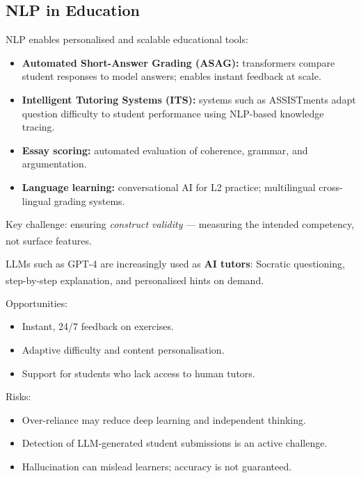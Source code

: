 \subsection{NLP in Education}

\begin{tcbitemize}[ skin=sectionraster ]

    \tcbitem[title=NLP Applications in Education, raster multicolumn=3]
    NLP enables personalised and scalable educational tools:
    \begin{itemize}
        \item \textbf{Automated Short-Answer Grading (ASAG):} transformers compare
              student responses to model answers; enables instant feedback at scale.
        \item \textbf{Intelligent Tutoring Systems (ITS):} systems such as ASSISTments
              adapt question difficulty to student performance using NLP-based knowledge
              tracing.
        \item \textbf{Essay scoring:} automated evaluation of coherence, grammar, and
              argumentation.
        \item \textbf{Language learning:} conversational AI for L2 practice;
              multilingual cross-lingual grading systems.
    \end{itemize}
    Key challenge: ensuring \emph{construct validity} --- measuring the intended
    competency, not surface
    features.\textsuperscript{\cite[][p.~11]{dhamaniIntroductionGenerativeAI2024}}

    \tcbitem[title=LLMs as Educational Assistants, raster multicolumn=3]
    LLMs such as GPT-4 are increasingly used as \textbf{AI tutors}: Socratic
    questioning, step-by-step explanation, and personalised hints on
    demand.\textsuperscript{\cite[][p.~2]{farrisHowLargeLanguage2025}}

    Opportunities:
    \begin{itemize}
        \item Instant, 24/7 feedback on exercises.
        \item Adaptive difficulty and content personalisation.
        \item Support for students who lack access to human tutors.
    \end{itemize}

    Risks:
    \begin{itemize}
        \item Over-reliance may reduce deep learning and independent thinking.
        \item Detection of LLM-generated student submissions is an active challenge.
        \item Hallucination can mislead learners; accuracy is not guaranteed.
    \end{itemize}

\end{tcbitemize}


